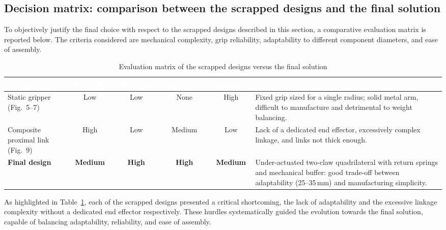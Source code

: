 \subsection{Decision matrix: comparison between the scrapped designs and the final solution}
To objectively justify the final choice with respect to the scrapped designs described in this
section, a comparative evaluation matrix is reported below. The criteria considered are
mechanical complexity, grip reliability, adaptability to different component diameters, and ease
of assembly.

\begin{table}[H]
	\centering
	\caption{Evaluation matrix of the scrapped designs versus the final solution}
	\label{tab:decision-matrix}
	\renewcommand{\arraystretch}{1.4}
	\begin{tabular}{|p{3.1cm}|c|c|c|c|p{4.6cm}|}
		\hline
		\rowcolor{black}
		\textcolor{white}{\textbf{Design}} &
		\textcolor{white}{\textbf{Complexity}} &
		\textcolor{white}{\textbf{Reliability}} &
		\textcolor{white}{\textbf{Adaptability}} &
		\textcolor{white}{\textbf{Assembly}} &
		\textcolor{white}{\textbf{Note}} \\
		\hline
		Static gripper (Fig.~5--7) & Low & Low & None & High &
		Fixed grip sized for a single radius; solid metal arm, difficult to manufacture and detrimental to weight balancing. \\
		\hline
		Composite proximal link (Fig.~9) & High & Low & Medium & Low &
		Lack of a dedicated end effector, excessively complex linkage, and links not thick enough. \\
		\hline
		\textbf{Final design} & \textbf{Medium} & \textbf{High} & \textbf{High} & \textbf{Medium} &
		Under-actuated two-claw quadrilateral with return springs and mechanical buffer: good trade-off between adaptability (25--35\,mm) and manufacturing simplicity. \\
		\hline
	\end{tabular}
\end{table}

As highlighted in Table~\ref{tab:decision-matrix}, each of the scrapped designs presented a
critical shortcoming, the lack of adaptability and the excessive linkage
complexity without a dedicated end effector respectively. These hurdles systematically guided the evolution towards
the final solution, capable of balancing adaptability, reliability, and ease of assembly.